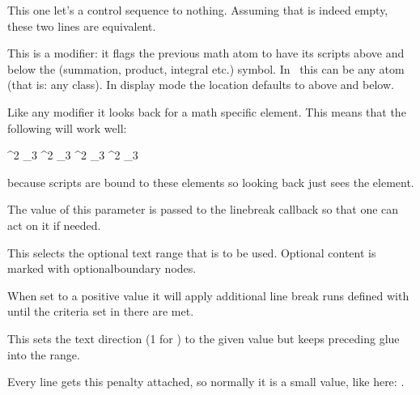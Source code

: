 This one let's a control sequence to nothing. Assuming that \type {\empty}
is indeed empty, these two lines are equivalent.

\starttyping
\let         \foo\empty
{}\oof
\stoptyping

\stopnewprimitive

\startoldprimitive[title={\prm {limits}}]

This is a modifier: it flags the previous math atom to have its scripts above and
below the (summation, product, integral etc.) symbol. In \LUAMETATEX\ this can be
any atom (that is: any class). In display mode the location defaults to above and
below.

Like any modifier it looks back for a math specific element. This means that the
following will work well:

\starttyping
\sum \limits ^2 _3
\sum ^2 \limits _3
\sum ^2 _3 \limits
\sum ^2 _3 \limits \nolimits \limits
\stoptyping

because scripts are bound to these elements so looking back just sees the element.

\stopoldprimitive

\startnewprimitive[title={\prm {linebreakchecks}}]

The value of this parameter is passed to the linebreak callback so that one can
act on it if needed.

\stopnewprimitive

\startnewprimitive[title={\prm {linebreakoptional}}]

This selects the optional text range that is to be used. Optional content is
marked with {optionalboundary} nodes.

\stopnewprimitive

\startnewprimitive[title={\prm {linebreakpasses}}]

When set to a positive value it will apply additional line break runs defined
with  until the criteria set in there are met.

\stopnewprimitive

\startnewprimitive[title={\prm {linedirection}}]

This sets the text direction (1 for ) to the given value but keeps
preceding glue into the range.

\stopnewprimitive

\startoldprimitive[title={\prm {linepenalty}}]

Every line gets this penalty attached, so normally it is a small value, like
here: \the \linepenalty.

